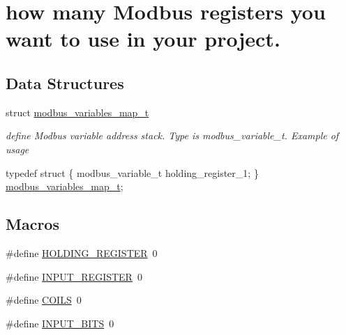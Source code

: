 \hypertarget{group___insert}{}\section{how many Modbus registers you want to use in your project.}
\label{group___insert}
\subsection*{Data Structures}
\begin{DoxyCompactItemize}
\item 
struct \mbox{\hyperlink{structmodbus__variables__map__t}{modbus\+\_\+variables\+\_\+map\+\_\+t}}
\begin{DoxyCompactList}\small\item\em define Modbus variable address stack. Type is modbus\+\_\+variable\+\_\+t. Example of usage 
\begin{DoxyCode}
\textcolor{keyword}{typedef} \textcolor{keyword}{struct }\{
   modbus\_variable\_t holding\_register\_1;
\} \mbox{\hyperlink{structmodbus__variables__map__t}{modbus\_variables\_map\_t}};
\end{DoxyCode}
 \end{DoxyCompactList}\end{DoxyCompactItemize}
\subsection*{Macros}
\begin{DoxyCompactItemize}
\item 
\#define \mbox{\hyperlink{group___insert_gae4693a6ca50104a719f8ed840bb419ac}{H\+O\+L\+D\+I\+N\+G\+\_\+\+R\+E\+G\+I\+S\+T\+ER}}~0
\item 
\#define \mbox{\hyperlink{group___insert_ga2f10b7e4e03726942f00d00c9888f2dc}{I\+N\+P\+U\+T\+\_\+\+R\+E\+G\+I\+S\+T\+ER}}~0
\item 
\#define \mbox{\hyperlink{group___insert_ga0b65fe24e4d83c129574194bea1ed036}{C\+O\+I\+LS}}~0
\item 
\#define \mbox{\hyperlink{group___insert_gaae865db01e31dbe4754638af380ff0d1}{I\+N\+P\+U\+T\+\_\+\+B\+I\+TS}}~0
\end{DoxyCompactItemize}
